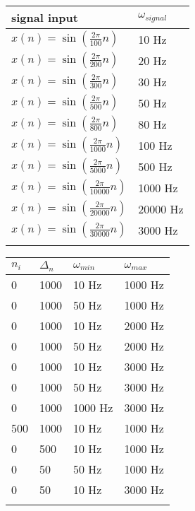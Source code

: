 \documentclass[12pt, titlepage]{article}
\begin{document}
\begin{table}[!h]
  \caption{Area of testing 1 - Inputs for testing, sampling period is 0.1 s} \label{Tblstandardinputs}
  \renewcommand{\arraystretch}{1.2}
\noindent \begin{longtable*}{l l} 
  \toprule
  \textbf{signal input} & $\omega_{signal}$ \\
  \midrule 
  $x(n) = \sin (\frac{2 \pi}{100} n)$  & 10 Hz \\
  $x(n) = \sin (\frac{2 \pi}{200}  n)$ & 20 Hz \\
  $x(n) = \sin (\frac{2 \pi}{300}  n)$ & 30 Hz \\
  $x(n) = \sin (\frac{2 \pi}{500}  n)$ & 50 Hz \\
  $x(n) = \sin (\frac{2 \pi}{800}  n)$ & 80 Hz \\
  $x(n) = \sin (\frac{2 \pi}{1000}  n)$ & 100 Hz \\
  $x(n) = \sin (\frac{2 \pi}{5000}  n)$ & 500 Hz \\
  $x(n) = \sin (\frac{2 \pi}{10000}  n)$ & 1000 Hz \\
  $x(n) = \sin (\frac{2 \pi}{20000}  n)$ & 20000 Hz \\
  $x(n) = \sin (\frac{2 \pi}{30000}  n)$ & 3000 Hz \\
\bottomrule \\
\end{longtable*}
\end{table}


\begin{table}[!h]
  \caption{Area of testing 1 - Boundaries for testing} \label{Tblboundries}
  \renewcommand{\arraystretch}{1.2}
\noindent \begin{longtable*}{l l l l} 
  \toprule
  $n_i$ & $\Delta_n$ & $\omega_{min}$ & $\omega_{max}$ \\
   & 1000 & 10 Hz & 1000 Hz \\
0 & 1000 & 50 Hz & 1000 Hz \\
0 & 1000 & 10 Hz & 2000 Hz \\
0 & 1000 & 50 Hz & 2000 Hz \\
0 & 1000 & 10 Hz & 3000 Hz \\
0 & 1000 & 50 Hz & 3000 Hz \\
0 & 1000 & 1000 Hz & 3000 Hz \\
500 & 1000 & 10 Hz & 1000 Hz \\
0 & 500 & 10 Hz & 1000 Hz \\
0 & 50 & 50 Hz & 1000 Hz \\
0 & 50 & 10 Hz & 3000 Hz \\
\bottomrule \\
\end{longtable*}
\end{table}
\end{document}

